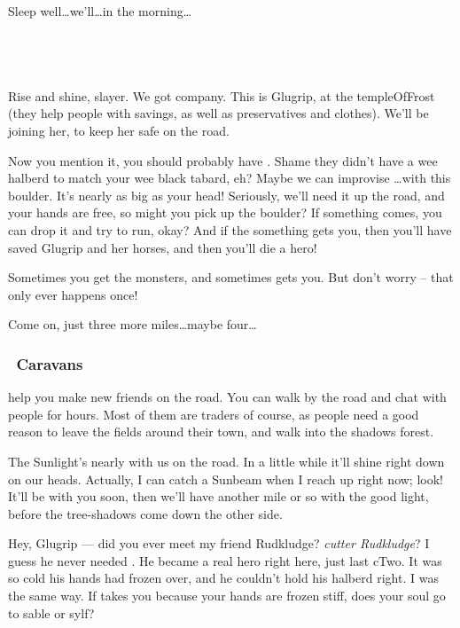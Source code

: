 {
  Sleep well\small\ldots we'll\ldots in \footnotesize the \scriptsize morning\ldots
}

\subsection*{~}

Rise and shine, slayer.
We got company.
This is Glugrip,  at the \gls{templeOfFrost} (they help people with savings, as well as preservatives and clothes).
We'll be joining her, to keep her safe on the road.

Now you mention it, you should probably have .
Shame they didn't have a wee halberd to match your wee black tabard, eh?
Maybe we can improvise \ldots with this boulder.
It's nearly as big as your head!
Seriously, we'll need it up the road, and your hands are free, so might you pick up the boulder?
If something comes, you can drop it and try to run, okay?
And if the something gets you, then you'll have saved Glugrip and her horses, and then you'll die a hero!

Sometimes you get the \glspl{monster}, and sometimes  gets you.
But don't worry -- that only ever happens once!

Come on, just three more miles\ldots maybe four\ldots

\subsubsection*{~Caravans}
help you make new friends on the road.
You can walk by the road and chat with people for hours.
Most of them are traders of course, as people need a good reason to leave the fields around their town, and walk into the shadows forest.

The Sunlight's nearly with us on the road.
In a little while it'll shine right down on our heads.
Actually, I can catch a Sunbeam when I reach up right now; look!
It'll be with you soon, then we'll have another mile or so with the good light, before the tree-shadows come down the other side.

Hey, Glugrip --- did you ever meet my friend Rudkludge?
\emph{\Gls{cutter} Rudkludge}?
I guess he never needed .
He became a real hero right here, just last \gls{cTwo}.
It was so cold his hands had frozen over, and he couldn't hold his halberd right.
I was the same way.
If  takes you because your hands are frozen stiff, does your soul go to \gls{sable} or \gls{sylf}?

